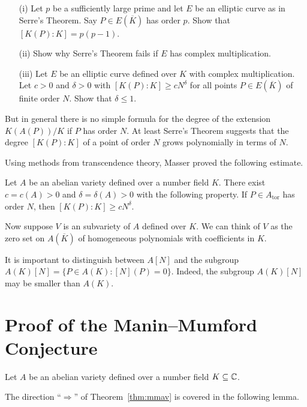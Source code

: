 \begin{exercise}
  \begin{enumerate}
  \item [(i)]  Let $p$ be a sufficiently large prime and let $E$ be
    an elliptic curve as in Serre's Theorem. Say $P\in E(\overline K)$ has
    order $p$. Show that $[K(P):K] = p(p-1)$.
  \item[(ii)] Show why Serre's Theorem fails if $E$ has complex
    multiplication.
  \item[(iii)] Let $E$ be an elliptic curve defined over $K$  with
    complex multiplication. Let $c>0$ and $\delta>0$ with
    $[K(P):K]\ge c N^{\delta}$ for all points $P\in E(\overline K)$ of
    finite order $N$. Show that $\delta \le 1$. 
  \end{enumerate}
\end{exercise}

But in general there is no simple formula for the degree of the
extension $K(A(P))/K$ if $P$ has order $N$. At least Serre's Theorem
suggests that the degree $[K(P):K]$ of a point of order $N$ grows
polynomially in terms of $N$.

Using methods from transcendence theory, Masser proved the following
estimate.

\begin{theorem}
  \label{thm:masser}
  Let $A$ be an abelian variety defined over a number field $K$. There
  exist $c=c(A)>0$ and $\delta=\delta(A)>0$ with the following
  property. If $P \in A_{\mathrm{tor}}$ has order $N$, then
  $[K(P):K]\ge c N^{\delta}$. 
\end{theorem}


Now suppose $V$ is an  subvariety of $A$ defined over $K$. We can
think of $V$ as the zero set on $A(\overline K)$ of homogeneous
polynomials with coefficients in $K$. 

It is important to distinguish between $A[N]$ and the subgroup
$A(K)[N] = \{P\in A(K) : [N](P)=0\}$. Indeed, the subgroup $A(K)[N]$ may be
smaller than $A(K)$.


\section{Proof of the Manin--Mumford Conjecture}

Let $A$ be an abelian variety defined over a number field
$K\subseteq{\mathbb{C}}$.

The direction ``$\Longrightarrow$'' of Theorem~\ref{thm:mmav} is covered in
the following lemma.

